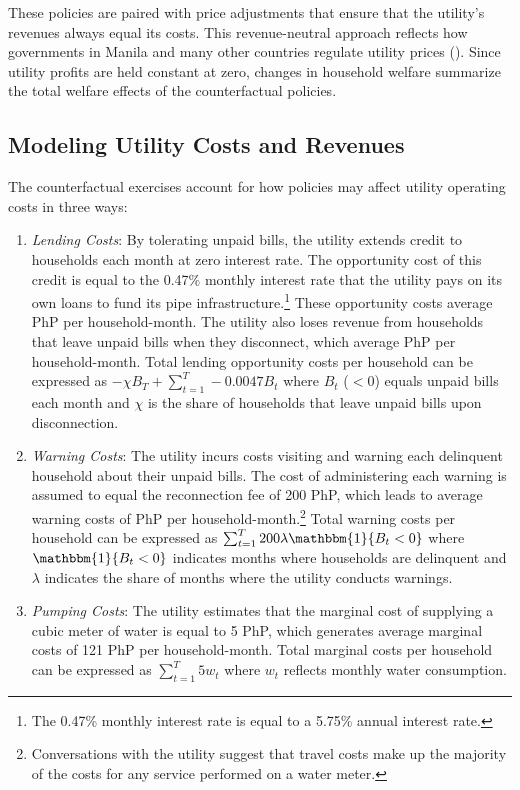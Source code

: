 \documentclass[12pt,table]{article}
\begin{document}
These policies are paired with price adjustments that ensure that the utility's revenues always equal its costs.  This revenue-neutral approach reflects how governments in Manila and many other countries regulate utility prices (\cite{hoque2013state}).  Since utility profits are held constant at zero, changes in household welfare summarize the total welfare effects of the counterfactual policies.  

\subsection{Modeling Utility Costs and Revenues}

The counterfactual exercises account for how policies may affect utility operating costs in three ways:
\begin{enumerate}
	\item \textit{Lending Costs}:  By tolerating unpaid bills, the utility extends credit to households each month at zero interest rate.  The opportunity cost of this credit is equal to the 0.47\% monthly interest rate that the utility pays on its own loans to fund its pipe infrastructure.\footnote{The 0.47\% monthly interest rate is equal to a 5.75\% annual interest rate.}  These opportunity costs average PhP per household-month.  The utility also loses revenue from households that leave unpaid bills when they disconnect, which average PhP per household-month.  Total lending opportunity costs per household can be expressed as $ - \chi B_T + \sum_{t=1}^{T}  - 0.0047 B_t $ where $B_t$ ($<0$) equals unpaid bills each month and $\chi$ is the share of households that leave unpaid bills upon disconnection.

	\item \textit{Warning Costs}:  The utility incurs costs visiting and warning each delinquent household about their unpaid bills.  The cost of administering each warning is assumed to equal the reconnection fee of 200 PhP, which leads to average warning costs of PhP per household-month.\footnote{Conversations with the utility suggest that travel costs make up the majority of the costs for any service performed on a water meter.}  Total warning costs per household can be expressed as  $\sum_{t=1}^{T} 200 \lambda \mathbbm{1}\{B_t < 0 \}  $ where $ \mathbbm{1}\{B_t < 0 \}$ indicates months where households are delinquent and $\lambda$ indicates the share of months where the utility conducts warnings.

	\item \textit{Pumping Costs}: The utility estimates that the marginal cost of supplying a cubic meter of water is equal to 5 PhP, which generates average marginal costs of 121 PhP per household-month.  Total marginal costs per household can be expressed as $\sum_{t=1}^{T} 5 w_t  $ where $w_t$ reflects monthly water consumption.
\end{enumerate}
\end{document}
